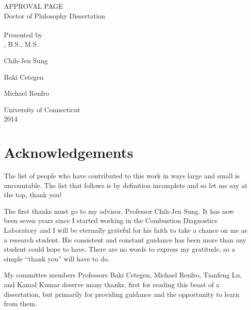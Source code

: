 \documentclass[12pt,letterpaper,oneside,final,openany]{book}
\begin{document}
\pagestyle{main}
\setcounter{page}{1}
\begin{center}
APPROVAL PAGE \\
Doctor of Philosophy Dissertation \\
\thetitle \\
\blankline \blankline
Presented by \\
\theauthor, B.S., M.S. \\
\end{center}
\blankline
{}
\vspace{-0.5\baselineskip}
\begin{center}
Chih-Jen Sung
\end{center}
\blankline
{}
\vspace{-0.5\baselineskip}
\begin{center}
Baki Cetegen
\end{center}
\blankline
{}
\vspace{-0.5\baselineskip}
\begin{center}
Michael Renfro
\end{center}
\blankline \blankline \blankline \blankline \blankline
\begin{center}
University of Connecticut \\
2014
\end{center}
\newpage

{}
\chapter*{Acknowledgements}

The list of people who have contributed to this work in ways large and small
is uncountable. The list that follows is by definition incomplete
and so let me say at the top, thank you!

The first thanks must go to my advisor, Professor Chih-Jen Sung. It has
now been seven years since I started working in the Combustion Diagnostics
Laboratory and I will be eternally grateful for his faith to take a
chance on me as a research student. His consistent and constant guidance
has been more than any student could hope to have. There are no words to
express my gratitude, so a simple ``thank you'' will have to do.

My committee members Professors Baki Cetegen, Michael Renfro, Tianfeng
Lu, and Kamal Kumar deserve many thanks, first for reading this beast of
a dissertation, but primarily for providing guidance and the opportunity
to learn from them.
\end{document}
